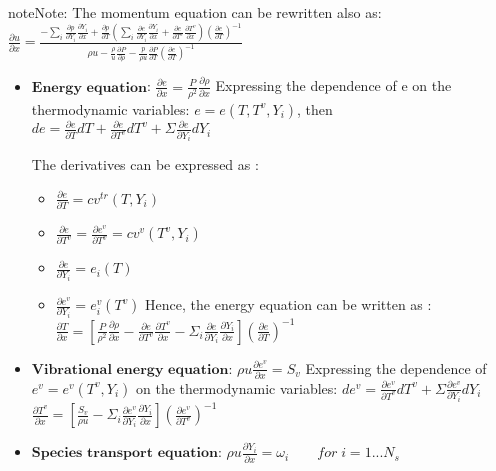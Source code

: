 \documentclass[letterpaper,10pt,english]{jupyterBook}
\begin{document}
\begin{sphinxadmonition}{note}{Note:}
\sphinxAtStartPar
The momentum equation can be rewritten also as:
\(\frac{\partial u}{\partial x} =\frac{- \sum_i \frac{\partial p}{\partial Y_i} \frac{\partial Y_i}{\partial x} + \frac{\partial p}{\partial T} \left( \sum_i \frac{\partial e}{\partial Y_i} \frac{\partial Y_i}{\partial x} + \frac{\partial e}{\partial T^v} \frac{\partial T^v}{\partial x} \right) \left( \frac{\partial e}{\partial T} \right)^{-1}}{\rho u - \frac{\rho}{u} \frac{\partial P}{\partial \rho} - \frac{p}{\rho u} \frac{\partial P}{\partial T} \left( \frac{\partial e}{\partial T} \right)^{-1}} \)
\end{sphinxadmonition}
\begin{itemize}
\item {} 
\sphinxAtStartPar
\(\textbf{Energy equation}\): 
\( \frac{\partial e}{\partial x} = \frac{P}{\rho^2} \frac{\partial \rho}{\partial x}\) 
Expressing the dependence of e on the thermodynamic variables: \( e = e (T, T^v, Y_i) \), then 
\( de = \frac{\partial e }{\partial T} dT + \frac{\partial e }{\partial T^v} dT^v + \Sigma \frac{\partial e }{\partial Y_i} dY_i\) 

\sphinxAtStartPar
The derivatives can be expressed as : 
\begin{itemize}
\item {} 
\sphinxAtStartPar
\( \frac{\partial e}{\partial T} = cv^{tr} (T, Y_i) \) 

\item {} 
\sphinxAtStartPar
\( \frac{\partial e}{\partial T^v} = \frac{\partial e^v}{\partial T^v} = cv^v (T^v, Y_i) \) 

\item {} 
\sphinxAtStartPar
\( \frac{\partial e}{\partial Y_i} = e_i(T) \) 

\item {} 
\sphinxAtStartPar
\( \frac{\partial e^v}{\partial Y_i} = e^v_i(T^v) \) 
Hence, the energy equation can be written as : 
\( \frac{\partial T}{\partial x} = \left [ \frac{P}{\rho^2} \frac{\partial \rho}{\partial x} - \frac{\partial e}{\partial T^v} \frac{\partial T^v}{\partial x} - \Sigma_i \frac{\partial e}{\partial Y_i} \frac{\partial Y_i}{\partial x} \right ] \left( \frac{\partial e}{\partial T} \right)^{-1}\) 

\end{itemize}

\item {} 
\sphinxAtStartPar
\(\textbf{Vibrational energy equation}\): 
\( \rho u \frac{\partial e^v}{\partial x} = S_v \) 
Expressing the dependence of \(e^v = e^v (T^v, Y_i)\) on the thermodynamic variables:
\( de^v = \frac{\partial e^v }{\partial T^v} dT^v + \Sigma \frac{\partial e^v }{\partial Y_i} dY_i\) 
\( \frac{\partial T^v}{\partial x} = \left [ \frac{S_v}{\rho u} - \Sigma_i \frac{\partial e^v}{\partial Y_i} \frac{\partial Y_i}{\partial x} \right ] \left( \frac{\partial e^v}{\partial T^v} \right)^{-1}\)

\item {} 
\sphinxAtStartPar
\(\textbf{Species transport equation}\): 
\( \rho u \frac{\partial Y_i }{\partial x} = \omega_i \qquad for \; i = 1 ... N_s \)

\end{itemize}
\end{document}
